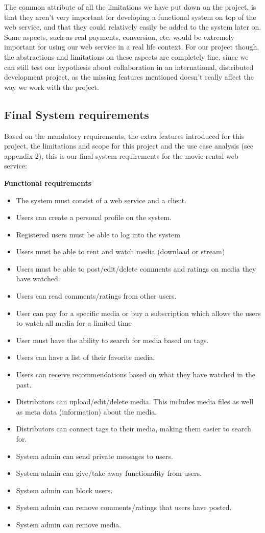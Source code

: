 \documentclass[10pt,a4paper]{article}
\begin{document}
The common attribute of all the limitations we have put down on the project, is that they aren't very important for developing a functional system on top of the web service, and that they could relatively easily be added to the system later on. Some aspects, such as real payments, conversion, etc. would be extremely important for using our web service in a real life context. For our project though, the abstractions and limitations on these aspects are completely fine, since we can still test our hypothesis about collaboration in an international, distributed development project, as the missing features mentioned doesn't really affect the way we work with the project.

\subsection{Final System requirements}
Based on the mandatory requirements, the extra features introduced for this project, the limitations and scope for this project and the use case analysis (see appendix 2), this is our final system requirements for the movie rental web service:

\textbf{Functional requirements}
\begin{itemize}
	\item The system must consist of a web service and a client.
	\item Users can create a personal profile on the system.
	\item Registered users must be able to log into the system
	\item Users must be able to rent and watch media (download or stream)
	\item Users must be able to post/edit/delete comments and ratings on media they have watched.
	\item Users can read comments/ratings from other users.
	\item User can pay for a specific media or buy a subscription which allows the users to watch all media for a limited time
	\item User must have the ability to search for media based on tags.
	\item Users can have a list of their favorite media.
	\item Users can receive recommendations based on what they have watched in the past.
	\item Distributors can upload/edit/delete media. This includes media files as well as meta data (information) about the media.
	\item Distributors can connect tags to their media, making them easier to search for.
	\item System admin can send private messages to users.
	\item System admin can give/take away functionality from users.
	\item System admin can block users.
	\item System admin can remove comments/ratings that users have posted.
	\item System admin can remove media.
\end{itemize}
\end{document}
